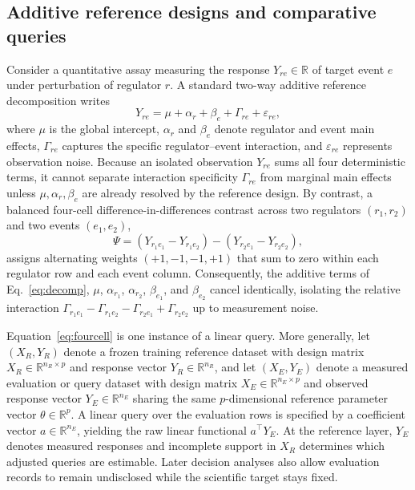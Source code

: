 \documentclass[preprint,12pt,number,sort&compress]{elsarticle}
\newcommand{\R}{\mathbb{R}}
\begin{document}
\subsection{Additive reference designs and comparative queries}
Consider a quantitative assay measuring the response $Y_{re} \in \R$ of target event $e$ under perturbation of regulator $r$. A standard two-way additive reference decomposition writes
\begin{equation}\label{eq:decomp}
Y_{re} = \mu + \alpha_r + \beta_e + \Gamma_{re} + \varepsilon_{re},
\end{equation}
where $\mu$ is the global intercept, $\alpha_r$ and $\beta_e$ denote regulator and event main effects, $\Gamma_{re}$ captures the specific regulator--event interaction, and $\varepsilon_{re}$ represents observation noise. Because an isolated observation $Y_{re}$ sums all four deterministic terms, it cannot separate interaction specificity $\Gamma_{re}$ from marginal main effects unless $\mu, \alpha_r, \beta_e$ are already resolved by the reference design. By contrast, a balanced four-cell difference-in-differences contrast across two regulators $(r_1, r_2)$ and two events $(e_1, e_2)$,
\begin{equation}\label{eq:fourcell}
\Psi = (Y_{r_1 e_1} - Y_{r_1 e_2}) - (Y_{r_2 e_1} - Y_{r_2 e_2}),
\end{equation}
assigns alternating weights $(+1, -1, -1, +1)$ that sum to zero within each regulator row and each event column. Consequently, the additive terms of Eq.~\eqref{eq:decomp}, $\mu$, $\alpha_{r_1}$, $\alpha_{r_2}$, $\beta_{e_1}$, and $\beta_{e_2}$ cancel identically, isolating the relative interaction $\Gamma_{r_1 e_1} - \Gamma_{r_1 e_2} - \Gamma_{r_2 e_1} + \Gamma_{r_2 e_2}$ up to measurement noise.

Equation~\eqref{eq:fourcell} is one instance of a linear query. More generally, let $(X_R, Y_R)$ denote a frozen training reference dataset with design matrix $X_R \in \R^{n_R \times p}$ and response vector $Y_R \in \R^{n_R}$, and let $(X_E, Y_E)$ denote a measured evaluation or query dataset with design matrix $X_E \in \R^{n_E \times p}$ and observed response vector $Y_E \in \R^{n_E}$ sharing the same $p$-dimensional reference parameter vector $\theta \in \R^p$. A linear query over the evaluation rows is specified by a coefficient vector $a \in \R^{n_E}$, yielding the raw linear functional $a^\top Y_E$. At the reference layer, $Y_E$ denotes measured responses and incomplete support in $X_R$ determines which adjusted queries are estimable. Later decision analyses also allow evaluation records to remain undisclosed while the scientific target stays fixed.
\end{document}
